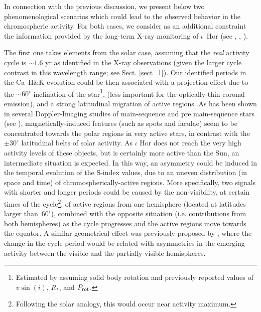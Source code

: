 \documentclass[a4paper,fleqn,usenatbib]{mnras}
\begin{document}
In connection with the previous discussion, we present below two phenomenological scenarios which could lead to the observed behavior in the chromospheric activity. For both cases, we consider as an additional constraint the information provided by the long-term X-ray monitoring of $\iota$~Hor (see , , ). 

The first one takes elements from the solar case, assuming that the \textit{real} activity cycle is $\sim$$1.6$ yr as identified in the X-ray observations (given the larger cycle contrast in this wavelength range; see Sect. \ref{sect_1}). Our identified periods in the Ca~H\&K evolution could be then associated with a projection effect due to the $\sim$$60^{\circ}$ inclination of the star\footnote[13]{Estimated by  assuming solid body rotation and previously reported values of $v\sin(i)$, $R_{*}$, and $P_{\rm rot}$.}, (less important for the optically-thin coronal emission), and a strong latitudinal migration of active regions. As has been shown in several Doppler-Imaging studies of main-sequence and pre main-sequence stars (see ), magnetically-induced features (such as spots and faculae) seem to be concentrated towards the polar regions in very active stars, in contrast with the $\pm30^{\circ}$ latitudinal belts of solar activity. As $\iota$ Hor does not reach the very high activity levels of these objects, but is certainly more active than the Sun, an intermediate situation is expected. In this way, an asymmetry could be induced in the temporal evolution of the S-index values, due to an uneven distribution (in space and time) of chromospherically-active regions. More specifically, two signals with shorter and longer periods could be caused by the non-visibility, at certain times of the cycle\footnote[14]{Following the solar analogy, this would occur near activity maximum.}, of active regions from one hemisphere (located at latitudes larger than~$60^{\circ}$), combined with the opposite situation (i.e. contributions from both hemispheres) as the cycle progresses and the active regions move towards the equator. A similar geometrical effect was previously proposed by , where the change in the cycle period would be related with asymmetries in the emerging activity between the visible and the partially visible hemispheres.
\end{document}
